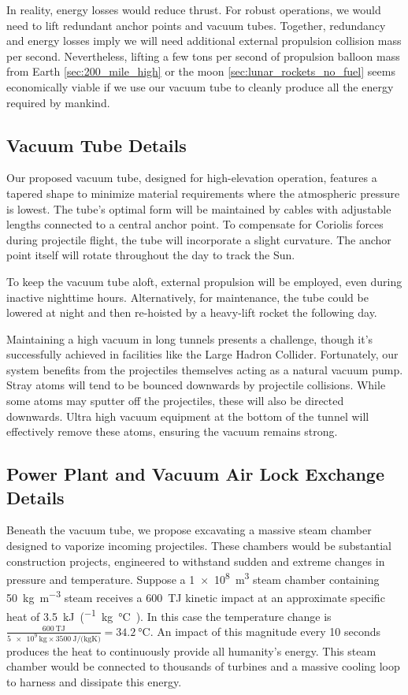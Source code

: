 \documentclass{article}
\begin{document}
In reality, energy losses would reduce thrust.   For robust operations, we would need to lift redundant anchor points and vacuum tubes.  Together, redundancy and energy losses imply we will need additional external propulsion collision mass per second.  Nevertheless, lifting a few tons per second of propulsion balloon mass from Earth \autoref{sec:200_mile_high} or the moon \autoref{sec:lunar_rockets_no_fuel} seems economically viable if we use our vacuum tube to cleanly produce all the energy required by mankind. 

\subsection{Vacuum Tube Details}
Our proposed vacuum tube, designed for high-elevation operation, features a tapered shape to minimize material requirements where the atmospheric pressure is lowest. The tube's optimal form will be maintained by cables with adjustable lengths connected to a central anchor point. To compensate for Coriolis forces during projectile flight, the tube will incorporate a slight curvature. The anchor point itself will rotate throughout the day to track the Sun.

To keep the vacuum tube aloft, external propulsion will be employed, even during inactive nighttime hours. Alternatively, for maintenance, the tube could be lowered at night and then re-hoisted by a heavy-lift rocket the following day.

Maintaining a high vacuum in long tunnels presents a challenge, though it's successfully achieved in facilities like the Large Hadron Collider. Fortunately, our system benefits from the projectiles themselves acting as a natural vacuum pump. Stray atoms will tend to be bounced downwards by  projectile collisions. While some atoms may sputter off the projectiles, these will also be directed downwards. Ultra high vacuum equipment at the bottom of the tunnel will effectively remove these atoms, ensuring the vacuum remains strong.

\subsection{Power Plant and Vacuum Air Lock Exchange Details}
Beneath the vacuum tube, we propose excavating a massive steam chamber designed to vaporize incoming projectiles. These chambers would be substantial construction projects, engineered to withstand sudden and extreme changes in pressure and temperature.  Suppose a \SI{1e8}{\cubic\meter} steam chamber containing \SI{50}{\kilo\gram\per\cubic\meter} steam receives a \SI{600}{\tera\joule} kinetic impact at an approximate specific heat of \SI{3.5}{\kilo\joule\per(\kilo\gram\celsius)}.  In this case the temperature change is 
$\frac{\SI{600}{\tera\joule}}{\SI{5e9}{\kilo\gram}\times\SI{3500}{\joule\per(\kilo\gram\kelvin)}} = \SI{34.2}{\celsius}$.  An impact of this magnitude every 10 seconds produces the heat to continuously provide all humanity's energy.  This steam chamber would be connected to thousands of turbines and a massive cooling loop to harness and dissipate this energy.  
\end{document}
